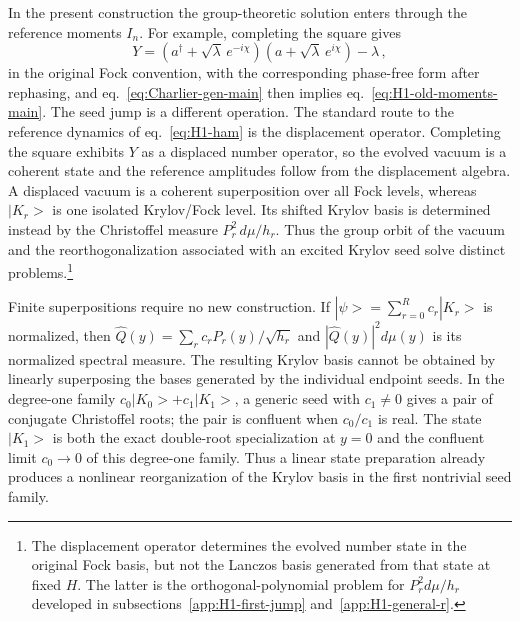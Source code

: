 \documentclass[a4paper,11pt]{article}
\def\ket#1{|#1>}%
\def\dd{d}%
\def\ii{i}%
\def\ee{e}%
\theoremstyle{definition}
\theoremstyle{remark}
\newcommand{\ket}[1]{|#1\rangle}
\newcommand{\dd}{\mathrm d}
\newcommand{\ii}{\mathrm i}
\newcommand{\ee}{\mathrm e}
\newcommand{\Qhat}{\widehat Q}
\begin{document}
In the present construction the group-theoretic solution enters through the reference moments \(I_n\). For example, completing the square gives
\begin{equation}
   Y=(a^\dagger+\sqrt\lambda\,\ee^{-\ii\chi})
     (a+\sqrt\lambda\,\ee^{\ii\chi})-\lambda\,,
\end{equation}
in the original Fock convention, with the corresponding phase-free form after rephasing, and eq.~\eqref{eq:Charlier-gen-main} then implies eq.~\eqref{eq:H1-old-moments-main}. The seed jump is a different operation. The standard route to the reference dynamics of eq.~\eqref{eq:H1-ham} is the displacement operator. Completing the square exhibits $Y$ as a displaced number operator, so the evolved vacuum is a coherent state and the reference amplitudes follow from the displacement algebra. A displaced vacuum is a coherent superposition over all Fock levels, whereas \(\ket{K_r}\) is one isolated Krylov/Fock level. Its shifted Krylov basis is determined instead by the Christoffel measure \(P_r^2\,\dd\mu/h_r\). Thus the group orbit of the vacuum and the reorthogonalization associated with an excited Krylov seed solve distinct problems.\footnote{The displacement operator determines the evolved number state in the original Fock basis, but not the Lanczos basis generated from that state at fixed $H$. The latter is the orthogonal-polynomial problem for $P_r^2\dd\mu/h_r$ developed in subsections~\ref{app:H1-first-jump} and~\ref{app:H1-general-r}.}

Finite superpositions require no new construction. If $\ket{\psi}=\sum_{r=0}^{R}c_r\ket{K_r}$ is normalized, then $\Qhat(y)=\sum_r c_rP_r(y)/\sqrt{h_r}$ and $|\Qhat(y)|^2\dd\mu(y)$ is its normalized spectral measure. The resulting Krylov basis cannot be obtained by linearly superposing the bases generated by the individual endpoint seeds. In the degree-one family \(c_0\ket{K_0}+c_1\ket{K_1}\), a generic seed with \(c_1\ne0\) gives a pair of conjugate Christoffel roots; the pair is confluent when \(c_0/c_1\) is real. The state \(\ket{K_1}\) is both the exact double-root specialization at \(y=0\) and the confluent limit \(c_0\to0\) of this degree-one family. Thus a linear state preparation already produces a nonlinear reorganization of the Krylov basis in the first nontrivial seed family.
\end{document}
